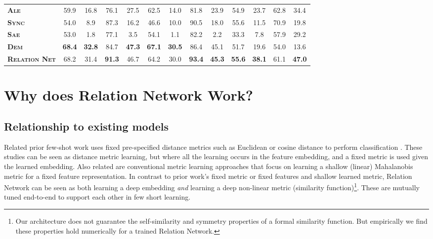 \documentclass[10pt,twocolumn,letterpaper]{article}
\begin{document}
\begin{table*}[ht]
\begin{tabular}{@{} l|c|ccc|c|ccc|c|ccc @{}}
\textbf{\textsc{Ale}}~\cite{akata2016label}  &59.9 & 16.8& 76.1& 27.5 &62.5 &14.0 &81.8 &23.9 &54.9 & 23.7& 62.8& 34.4 \\ 
\textbf{\textsc{Sync}}~\cite{changpinyo2016synthesized}  &54.0 & 8.9& 87.3& 16.2 &46.6 &10.0 & 90.5&18.0 &55.6 & 11.5& 70.9& 19.8\\ 
\textbf{\textsc{Sae}}~\cite{kodirov2017semantic}  &53.0 & 1.8& 77.1& 3.5 &54.1 &1.1 & 82.2&2.2 &33.3 & 7.8& 57.9& 29.2\\ 
\midrule
\textbf{\textsc{Dem}}~\cite{zhang2017learning}  &\textbf{68.4} & \textbf{32.8}& 84.7&\textbf{47.3} &\textbf{67.1} &\textbf{30.5} & 86.4&45.1 &51.7 & 19.6& 54.0& 13.6\\ 
\midrule
\textbf{\textsc{Relation} \textsc{Net}} &68.2 &31.4 &\textbf{91.3} &46.7 &64.2 &30.0 &\textbf{93.4} &\textbf{45.3}  &\textbf{55.6} &\textbf{38.1} &61.1 &\textbf{47.0}  \\ 
\bottomrule
\end{tabular}\vspace{-0.2cm}
\caption{\small Comparative results under the GBU setting. Under the conventional 
ZSL setting, the performance is evaluated using  per-class average Top-1 (\textbf{T1}) accuracy (\%), and under GZSL, it is  measured using  \textbf{u} = \textbf{T1} on unseen classes, \textbf{s} = \textbf{T1} on seen classes, and \textbf{H} = harmonic mean.}
\label{tab:gzsl}
\end{table*}



\section{Why does Relation Network Work?}\label{model_sanity}


\subsection{Relationship to existing models}
Related prior few-shot work uses fixed pre-specified distance metrics such as Euclidean or cosine distance to perform classification \cite{vinyals2016matching, snell2017prototypical}. These studies can be seen as distance metric learning, but where all the learning occurs in the feature embedding, and a fixed metric is used given the learned embedding. Also related are conventional metric learning approaches \cite{mensink2012metric,chen2012jointBayesian} that focus on learning a shallow (linear) Mahalanobis metric for a fixed feature representation. In contrast to prior work's fixed metric or fixed features and shallow learned metric, Relation Network can be seen as  both learning a deep embedding {\em and} learning a deep non-linear metric (similarity function)\footnote{Our architecture does not guarantee the self-similarity and symmetry properties of a formal similarity function. But empirically we find these properties hold numerically for a trained Relation Network.}. These are mutually tuned end-to-end to support each other in few short learning.
\end{document}
